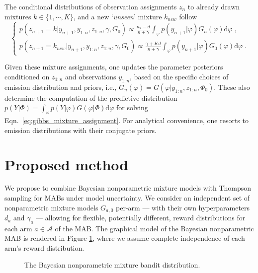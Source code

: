 \documentclass{article}
\newcommand{\dd}[1]{\mathrm{d} #1}
\newcommand{\A}{\mathcal{A}}
\newcommand{\ie}{i.e., }
\begin{document}
The conditional distributions of observation assignments $z_n$ to already drawn mixtures $k\in\{1, \cdots, K\}$, and a new `\textit{unseen}' mixture $k_{new}$ follow
\begin{equation}
\begin{cases}
p(z_{n+1}=k|y_{n+1},y_{1:n},z_{1:n}, \gamma, G_0) \propto \frac{n_k-d}{n+\gamma} \int_{\varphi} p(y_{n+1}|\varphi) G_n(\varphi) \dd{\varphi}\; ,\\
p(z_{n+1}=k_{new}|y_{n+1},y_{1:n},z_{1:n}, \gamma, G_0) \propto \frac{\gamma+K d}{n+\gamma} \int_{\varphi} p(y_{n+1}|\varphi) G_0(\varphi) \dd{\varphi} \; .
\end{cases}
\label{eq:gibbs_mixture_assignment}
\end{equation}

Given these mixture assignments, one updates the parameter posteriors conditioned on $z_{1:n}$ and observations $y_{1:n}$, based on the specific choices of emission distribution and priors, \ie $G_n(\varphi)=G(\varphi|y_{1:n}, z_{1:n},\varPhi_0)$. These also determine the computation of the predictive distribution $p(Y|\varPhi)= \int_{\varphi} p(Y|\varphi) G(\varphi|\varPhi) \dd{\varphi}$ for solving Eqn.~\eqref{eq:gibbs_mixture_assignment}. For analytical convenience, one resorts to emission distributions with their conjugate priors.

\section{Proposed method}
\label{sec:proposed_method}

We propose to combine Bayesian nonparametric mixture models with Thompson sampling for MABs under model uncertainty. We consider an independent set of nonparametric mixture models $G_{a,0}$ per-arm --- with their own hyperparameters $d_a$ and $\gamma_a$ --- allowing for flexible, potentially different, reward distributions for each arm $a\in\A$ of the MAB. The graphical model of the Bayesian nonparametric MAB is rendered in Figure \ref{fig:pgm_nonparametric_bandit}, where we assume complete independence of each arm's reward distribution.

\begin{figure}[!h]
	\begin{center}
		\resizebox{0.35\textwidth}{!}{
			
		}
		\vspace*{-1ex}
		\caption{The Bayesian nonparametric mixture bandit distribution.}
		\label{fig:pgm_nonparametric_bandit}
	\end{center}
	\vspace*{-4ex}
\end{figure}
\end{document}
